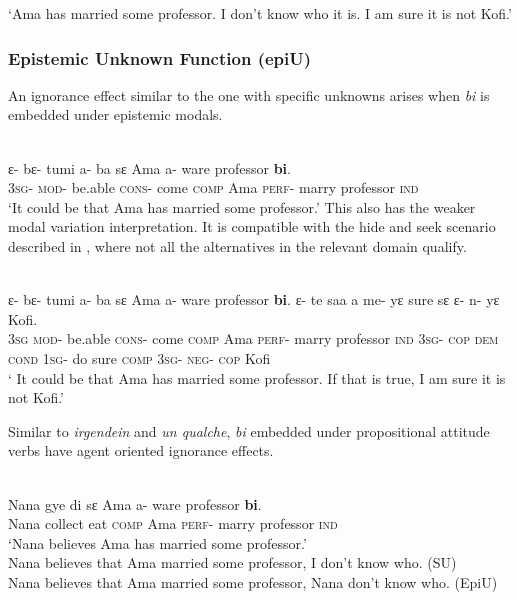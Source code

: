\documentclass[output=paper,modfonts,nonflat,draftmode]{langsci/langscibook}
\begin{document}
\glt `Ama has married some professor. I don't know who it is. I am sure it is not Kofi.' 
\z 

\subsubsection{Epistemic Unknown Function (epiU)}
An ignorance effect similar to the one with specific unknowns arises when \emph{bi} is embedded under epistemic modals.

\ea\label{owusu:ex42a}\\
 \gll  ε- bε- tumi a- ba sε Ama a- ware professor \textbf{bi}. 
\\
\textsc{3sg}- \textsc{mod}- be.able \textsc{cons}- come \textsc{comp} Ama \textsc{perf}- marry professor \textsc{ind} \\
    
\glt `It could be that Ama has married some professor.' 
\z 
This also has the weaker modal variation interpretation. It is compatible with the hide and seek scenario described in \citet{AloniPort2015}, where not all the alternatives in the relevant domain qualify.

\ea\label{owusu:ex42b}\\
 \gll  ε- bε- tumi a- ba sε Ama a- ware professor \textbf{bi}. ε- te saa a  me- yε sure sε ε- n- yε Kofi. \\
\textsc{3sg} 
 \textsc{mod}- be.able \textsc{cons}- come \textsc{comp} Ama \textsc{perf}- marry professor \textsc{ind} \textsc{3sg}- \textsc{cop} \textsc{dem} \textsc{cond} \textsc{1sg}- do sure \textsc{comp}  \textsc{3sg}- \textsc{neg}- \textsc{cop} Kofi\\
\glt ` It could be that Ama has married some professor. If that is true, I am sure it is not Kofi.' 
\z 

Similar to \emph{irgendein} and \emph{un qualche}, \emph{bi} embedded under propositional attitude verbs have agent oriented ignorance effects.  

 \ea\label{owusu:ex42c}\\
 \gll  Nana gye di sε Ama a- ware professor \textbf{bi}. \\
Nana collect eat \textsc{comp} Ama \textsc{perf}- marry professor \textsc{ind}\\
\glt `Nana believes Ama has married some professor.' \\
Nana believes that Ama married some professor, I don't know who. (SU)\\
Nana believes that Ama married some professor, Nana don't know who. (EpiU)
\z 
\end{document}
